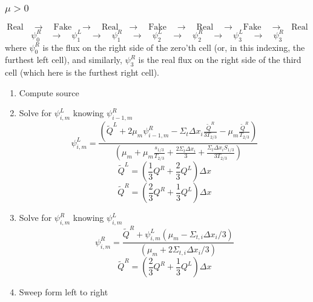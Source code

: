 \documentclass[a4paper]{article}
\begin{document}
 \subsubsection*{$\mu>0$}
 \[\mbox{Real}\quad\rightarrow\quad\mbox{Fake}\quad\rightarrow\quad\mbox{Real}\quad\rightarrow\quad\mbox{Fake}\quad\rightarrow\quad\mbox{Real}\quad\rightarrow\quad\mbox{Fake}\quad\rightarrow\quad\mbox{Real}\]
 \[\psi^R_{0}\quad\rightarrow\quad\psi^L_1\quad\rightarrow\quad\psi^R_1\quad\rightarrow\quad\psi^L_2\quad\rightarrow\quad\psi^R_2\quad\rightarrow\quad\psi^L_3\quad\rightarrow\quad\psi^R_3\]
where $\psi_0^R$ is the flux on the right side of the zero'th cell (or, in this indexing, the furthest left cell), and similarly, $\psi_3^R$ is the real flux on the right side of the third cell (which here is the furthest right cell).
\begin{enumerate}
  \item Compute source
  \item Solve for $\psi_{i,m}^L$ knowing $\psi_{i-1,m}^R$
    \[\psi_{i,m}^L=\frac{\left(\tilde{Q}^L+2\mu_m\psi_{i-1,m}^R-\Sigma_{t}\Delta x_{i}\frac{\tilde{Q}^R}{3T_{2/3}}-\mu_m\frac{\tilde{Q}^R}{T_{2/3}}\right)}{\left(\mu_m+\mu_m\frac{s_{1/3}}{T_{2/3}}+\frac{2\Sigma_{t}\Delta x_{i}}{3}+\frac{\Sigma_{t}\Delta x_{i}S_{1/3}}{3T_{2/3}}\right)}\]
    \[\tilde{Q}^{L}=\left(\frac{1}{3}Q^{R}+\frac{2}{3}Q^{L}\right)\Delta x\]
    \[\tilde{Q}^{R}=\left(\frac{2}{3}Q^{R}+\frac{1}{3}Q^{L}\right)\Delta x\]
  \item Solve for $\psi_{i,m}^R$ knowing $\psi_{i,m}^L$
    \[\psi_{i,m}^R=\frac{\tilde{Q}^R+\psi_{i,m}^{L}\left(\mu_{m}-\Sigma_{t,i}\Delta x_{i}/3\right)}{\left(\mu_{m}+2\Sigma_{t,i}\Delta x_{i}/3\right)}\]
    \[\tilde{Q}^{R}=\left(\frac{2}{3}Q^{R}+\frac{1}{3}Q^{L}\right)\Delta x\]

  \item Sweep form left to right
\end{enumerate}
\end{document}
